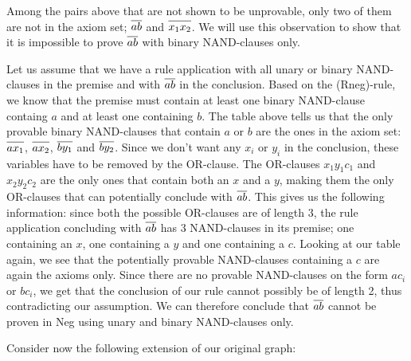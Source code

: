 Among the pairs above that are not shown to be unprovable, only two of them are not in the axiom set; $\ol{ab}$ and $\ol{x_1x_2}$.
We will use this observation to show that it is impossible to prove $\ol{ab}$ with binary NAND-clauses only.

Let us assume that we have a rule application with all unary or binary NAND-clauses in the premise and with $\ol{ab}$ in the conclusion.
Based on the (Rneg)-rule, we know that the premise must contain at least one binary NAND-clause containg $a$ and at least one containing $b$.
The table above tells us that the only provable binary NAND-clauses that contain $a$ or $b$ are the ones in the axiom set:
$\ol{ax_1}$, $\ol{ax_2}$, $\ol{by_1}$ and $\ol{by_2}$.
Since we don't want any $x_i$ or $y_i$ in the conclusion, these variables have to be removed by the OR-clause.
The OR-clauses $x_1y_1c_1$ and $x_2y_2c_2$ are the only ones that contain both an $x$ and a $y$, making them the only OR-clauses that can potentially conclude with $\ol{ab}$.
This gives us the following information: since both the possible OR-clauses are of length 3, the rule application concluding with $\ol{ab}$ has 3 NAND-clauses in its premise; one containing an $x$, one containing a $y$ and one containing a $c$.
Looking at our table again, we see that the potentially provable NAND-clauses containing a $c$ are again the axioms only.
Since there are no provable NAND-clauses on the form $ac_i$ or $bc_i$, we get that the conclusion of our rule cannot possibly be of length 2, thus contradicting our assumption.
We can therefore conclude that $\ol{ab}$ cannot be proven in Neg using unary and binary NAND-clauses only.

Consider now the following extension of our original graph:

